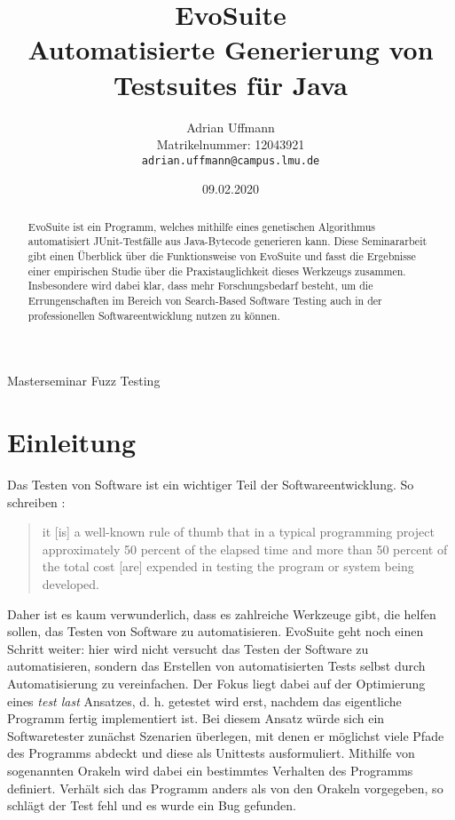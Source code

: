 \documentclass[a4paper,11pt]{article}
\title{\textbf{EvoSuite}\\
Automatisierte Generierung von Testsuites für Java}
\author{Adrian Uffmann\\
Matrikelnummer: 12043921\\
\texttt{adrian.uffmann@campus.lmu.de}}
\date{09.02.2020}
\begin{document}
\maketitle

\begin{center}
Masterseminar Fuzz Testing
\end{center}

\begin{abstract}
EvoSuite ist ein Programm, welches mithilfe eines genetischen Algorithmus automatisiert JUnit-Testfälle aus Java-Bytecode generieren kann.
Diese Seminararbeit gibt einen Überblick über die Funktionsweise von EvoSuite und fasst die Ergebnisse einer empirischen Studie über die Praxistauglichkeit dieses Werkzeugs zusammen.
Insbesondere wird dabei klar, dass mehr Forschungsbedarf besteht, um die Errungenschaften im Bereich von Search-Based Software Testing auch in der professionellen Softwareentwicklung nutzen zu können.
\end{abstract}

\section{Einleitung}

Das Testen von Software ist ein wichtiger Teil der Softwareentwicklung.
So schreiben \citet{myers2004art}:
\begin{quote}
it [is] a well-known rule of thumb that in a typical programming project approximately 50 percent of the elapsed time and more than 50 percent of the total cost [are] expended in testing the program or system being developed.
\end{quote}
Daher ist es kaum verwunderlich, dass es zahlreiche Werkzeuge gibt, die helfen sollen, das Testen von Software zu automatisieren.
EvoSuite geht noch einen Schritt weiter: hier wird nicht versucht das Testen der Software zu automatisieren, sondern das Erstellen von automatisierten Tests selbst durch Automatisierung zu vereinfachen.
Der Fokus liegt dabei auf der Optimierung eines \textit{test last} Ansatzes, d. h. getestet wird erst, nachdem das eigentliche Programm fertig implementiert ist.
Bei diesem Ansatz würde sich ein Softwaretester zunächst Szenarien überlegen, mit denen er möglichst viele Pfade des Programms abdeckt und diese als Unittests ausformuliert.
Mithilfe von sogenannten Orakeln wird dabei ein bestimmtes Verhalten des Programms definiert.
Verhält sich das Programm anders als von den Orakeln vorgegeben, so schlägt der Test fehl und es wurde ein Bug gefunden.
\end{document}
